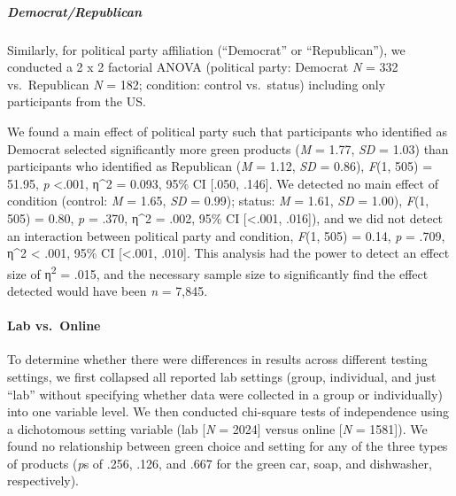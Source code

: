 \documentclass[
]{article}
\begin{document}
\subparagraph{Democrat/Republican}\label{democratrepublican}

Similarly, for political party affiliation (``Democrat'' or
``Republican''), we conducted a 2 x 2 factorial ANOVA (political party:
Democrat \emph{N} = 332 vs.~Republican \emph{N} = 182; condition:
control vs.~status) including only participants from the US.

We found a main effect of political party such that participants who
identified as Democrat selected significantly more green products
(\emph{M} = 1.77, \emph{SD} = 1.03) than participants who identified as
Republican (\emph{M} = 1.12, \emph{SD} = 0.86), \emph{F}(1, 505) =
51.95, \emph{p} \textless.001, η\^{}2 = 0.093, 95\% CI {[}.050, .146{]}.
We detected no main effect of condition (control: \emph{M} = 1.65,
\emph{SD} = 0.99); status: \emph{M} = 1.61, \emph{SD} = 1.00),
\emph{F}(1, 505) = 0.80, \emph{p} = .370, η\^{}2 = .002, 95\% CI
{[}\textless.001, .016{]}), and we did not detect an interaction between
political party and condition, \emph{F}(1, 505) = 0.14, \emph{p} = .709,
η\^{}2 \textless{} .001, 95\% CI {[}\textless.001, .010{]}. This
analysis had the power to detect an effect size of η\textsuperscript{2}
= .015, and the necessary sample size to significantly find the effect
detected would have been \emph{n} = 7,845.

\paragraph{Lab vs.~Online}\label{lab-vs.-online}

To determine whether there were differences in results across different
testing settings, we first collapsed all reported lab settings (group,
individual, and just ``lab'' without specifying whether data were
collected in a group or individually) into one variable level. We then
conducted chi-square tests of independence using a dichotomous setting
variable (lab {[}\emph{N} = 2024{]} versus online {[}\emph{N} =
1581{]}). We found no relationship between green choice and setting for
any of the three types of products (\emph{p}s of .256, .126, and .667
for the green car, soap, and dishwasher, respectively).
\end{document}
